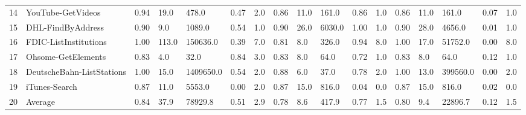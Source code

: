 \begin{tabular}{lllllllllllllllll}
14 & YouTube-GetVideos & 0.94 & 19.0 & 478.0 & 0.47 & 2.0 & 0.86 & 11.0 & 161.0 & 0.86 & 1.0 & 0.86 & 11.0 & 161.0 & 0.07 & 1.0 \\
15 & DHL-FindByAddress & 0.90 & 9.0 & 1089.0 & 0.54 & 1.0 & 0.90 & 26.0 & 6030.0 & 1.00 & 1.0 & 0.90 & 28.0 & 4656.0 & 0.01 & 1.0 \\
16 & FDIC-ListInstitutions & 1.00 & 113.0 & 150636.0 & 0.39 & 7.0 & 0.81 & 8.0 & 326.0 & 0.94 & 8.0 & 1.00 & 17.0 & 51752.0 & 0.00 & 8.0 \\
17 & Ohsome-GetElements & 0.83 & 4.0 & 32.0 & 0.84 & 3.0 & 0.83 & 8.0 & 64.0 & 0.72 & 1.0 & 0.83 & 8.0 & 64.0 & 0.12 & 1.0 \\
18 & DeutscheBahn-ListStations & 1.00 & 15.0 & 1409650.0 & 0.54 & 2.0 & 0.88 & 6.0 & 37.0 & 0.78 & 2.0 & 1.00 & 13.0 & 399560.0 & 0.00 & 2.0 \\
19 & iTunes-Search & 0.87 & 11.0 & 5553.0 & 0.00 & 2.0 & 0.87 & 15.0 & 816.0 & 0.04 & 0.0 & 0.87 & 15.0 & 816.0 & 0.02 & 0.0 \\
20 & Average & 0.84 & 37.9 & 78929.8 & 0.51 & 2.9 & 0.78 & 8.6 & 417.9 & 0.77 & 1.5 & 0.80 & 9.4 & 22896.7 & 0.12 & 1.5 \\
\bottomrule
\end{tabular}
